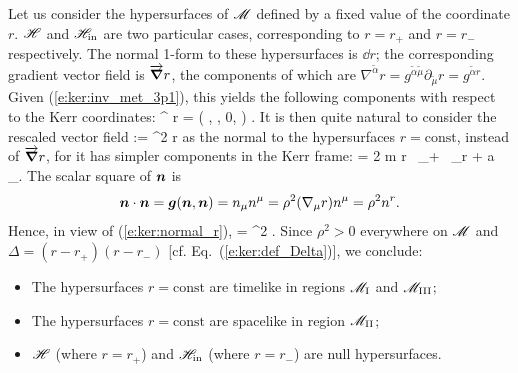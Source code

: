 Let us consider the hypersurfaces of $\mathscr{M}$ defined by a fixed value of
the coordinate $r$. $\mathscr{H}$ and $\mathscr{H}_{\rm in}$ are two particular cases,
corresponding to $r=r_+$ and $r=r_-$ respectively.
The normal 1-form to these hypersurfaces is $\dd r$; the corresponding
gradient vector field is $\overrightarrow{\bm{\nabla}} r$, the components of which are
$\nabla^{\tilde{\alpha}} r = g^{\tilde{\alpha}\tilde{\mu}} \partial_{\tilde{\mu}} r
= g^{\tilde{\alpha} r}$.
Given (\ref{e:ker:inv_met_3p1}), this yields the following components with respect to
the Kerr coordinates:
\be \label{e:ker:nab_r_comp}
    \nabla^{\tilde{\alpha}} r = \left( , , 0, 
            \right) .
\ee
It is then quite natural to consider the rescaled vector field
\be \label{e:ker:def_normal_hyp_r}
     := \rho^2 \vw{\nabla} r
\ee
as the normal to the hypersurfaces $r=\mathrm{const}$, instead of $ \overrightarrow{\bm{\nabla}} r$, for it
has simpler components in the Kerr frame:
\be \label{e:ker:normal_r}
     = 2 m r \, \wpar_\ti + \Delta \, \wpar_{\tilde r} + a \, \wpar_\tph .
\ee
The scalar square of $\bm{n}$ is
\[
    \bm{n}\cdot\bm{n} = \bm{g}(\bm{n},\bm{n}) = n_\mu n^\mu = \rho^2 (\nabla_\mu r) n^\mu
    = \rho^2 n^r .
\]
Hence, in view of (\ref{e:ker:normal_r}),
\be
    \cdot{} = \rho^2 \Delta .
\ee
Since $\rho^2>0$ everywhere on $\mathscr{M}$ and $\Delta = (r-r_+)(r-r_-)$ [cf. Eq.~(\ref{e:ker:def_Delta})], we conclude:
\begin{prop}[causal type of the hypersurfaces $r=\mathrm{const}$]
\begin{itemize}
\item The hypersurfaces $r=\mathrm{const}$ are timelike in regions $\mathscr{M}_{\rm I}$ and $\mathscr{M}_{\rm III}$;
\item The hypersurfaces $r=\mathrm{const}$ are spacelike in region $\mathscr{M}_{\rm II}$;
\item $\mathscr{H}$ (where $r=r_+$) and $\mathscr{H}_{\rm in}$ (where $r=r_-$) are null hypersurfaces.
\end{itemize}
\end{prop}

